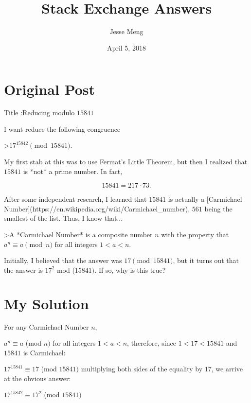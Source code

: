 \documentclass{article}
\title{Stack Exchange Answers}
\author{Jesse Meng }
\date{April 5, 2018}
\begin{document}
\maketitle

\section{Original Post}
Title :Reducing modulo $15841$

I want reduce the following congruence

>$17^{15842}\pmod{15841}$.

My first stab at this was to use Fermat's Little Theorem, but then I realized that $15841$ is *not* a prime number. In fact,

$$15841 = 217 \cdot 73.$$

After some independent research, I learned that $15841$ is actually a [Carmichael Number](https://en.wikipedia.org/wiki/Carmichael_number), $561$ being the smallest of the list. Thus, I know that...

>A *Carmichael Number* is a composite number $n$ with the property that $a^n \equiv a\pmod n$ for all integers $1 < a < n.$

Initially, I believed that the answer was $17\pmod{15841}$, but it turns out that the answer is $17^2$ mod ($15841).$ If so, why is this true?
 
\section{My Solution}
For any Carmichael Number $n$,

$a^n \equiv a$ (mod $n)$ for all integers $1 < a < n$, therefore, since $1<17<15841$ and $15841$ is Carmichael:

$17^{15841} \equiv 17$ (mod $15841)$ multiplying both sides of the equality by $17$, we arrive at the obvious answer:

$17^{15842} \equiv 17^2$ (mod $15841)$
\end{document}
